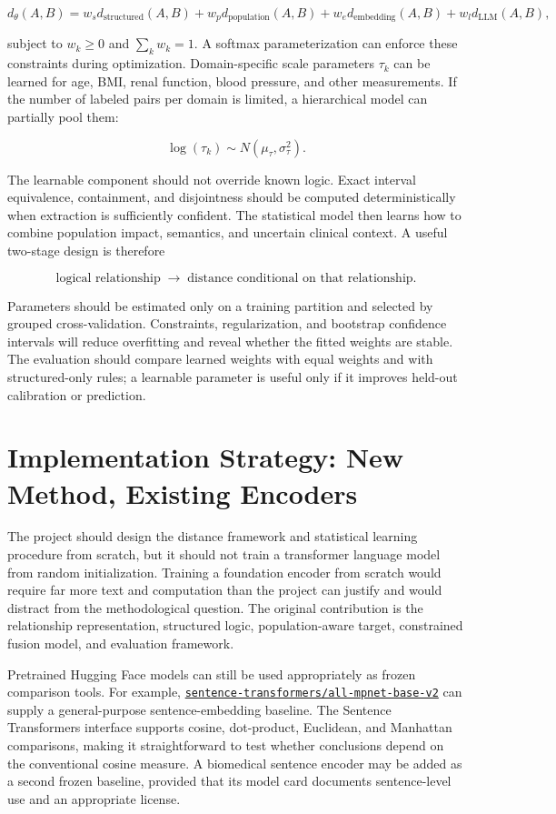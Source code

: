 \documentclass[11pt]{article}
\begin{document}
\[
d_{\theta}(A,B)=
w_s d_{\mathrm{structured}}(A,B)
+w_p d_{\mathrm{population}}(A,B)
+w_e d_{\mathrm{embedding}}(A,B)
+w_l d_{\mathrm{LLM}}(A,B),
\]

subject to $w_k\geq0$ and $\sum_k w_k=1$. A softmax parameterization can enforce these constraints during optimization. Domain-specific scale parameters $\tau_k$ can be learned for age, BMI, renal function, blood pressure, and other measurements. If the number of labeled pairs per domain is limited, a hierarchical model can partially pool them:

\[
\log(\tau_k)\sim N(\mu_{\tau},\sigma_{\tau}^{2}).
\]

The learnable component should not override known logic. Exact interval equivalence, containment, and disjointness should be computed deterministically when extraction is sufficiently confident. The statistical model then learns how to combine population impact, semantics, and uncertain clinical context. A useful two-stage design is therefore

\[
\text{logical relationship}\;\longrightarrow\;
\text{distance conditional on that relationship}.
\]

Parameters should be estimated only on a training partition and selected by grouped cross-validation. Constraints, regularization, and bootstrap confidence intervals will reduce overfitting and reveal whether the fitted weights are stable. The evaluation should compare learned weights with equal weights and with structured-only rules; a learnable parameter is useful only if it improves held-out calibration or prediction.

\section{Implementation Strategy: New Method, Existing Encoders}

The project should design the distance framework and statistical learning procedure from scratch, but it should not train a transformer language model from random initialization. Training a foundation encoder from scratch would require far more text and computation than the project can justify and would distract from the methodological question. The original contribution is the relationship representation, structured logic, population-aware target, constrained fusion model, and evaluation framework.

Pretrained Hugging Face models can still be used appropriately as frozen comparison tools. For example, \href{https://huggingface.co/sentence-transformers/all-mpnet-base-v2}{\texttt{sentence-transformers/all-mpnet-base-v2}} can supply a general-purpose sentence-embedding baseline. The Sentence Transformers interface supports cosine, dot-product, Euclidean, and Manhattan comparisons, making it straightforward to test whether conclusions depend on the conventional cosine measure. A biomedical sentence encoder may be added as a second frozen baseline, provided that its model card documents sentence-level use and an appropriate license.
\end{document}
